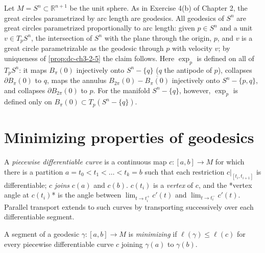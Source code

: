 \begin{example}
  \label{ex:dc-ch3-2-11}
  \notready
  Let $M=S^n\subset\mathbb{R}^{n+1}$ be the unit sphere. As in Exercise 4(b) of
  Chapter 2, the great circles parametrized by arc length are geodesics. All
  geodesics of $S^n$ are great circles parametrized proportionally to arc length:
  given $p\in S^n$ and a unit $v\in T_pS^n$, the intersection of $S^n$ with the
  plane through the origin, $p$, and $v$ is a great circle parametrizable as the
  geodesic through $p$ with velocity $v$; by uniqueness of \cref{prop:dc-ch3-2-5} the claim
  follows. Here $\exp_p$ is defined on all of $T_p S^n$: it maps $B_\pi(0)$
  injectively onto $S^n-\{q\}$ ($q$ the antipode of $p$), collapses
  $\partial B_\pi(0)$ to $q$, maps the annulus $B_{2\pi}(0)-\overline{B_\pi(0)}$
  injectively onto $S^n-\{p,q\}$, and collapses $\partial B_{2\pi}(0)$ to $p$.
  For the manifold $S^n-\{q\}$, however, $\exp_p$ is defined only on
  $B_\pi(0)\subset T_p(S^n-\{q\})$.
\end{example}

\section{Minimizing properties of geodesics}

\begin{definition}
  \label{def:dc-ch3-3-1}
  A \emph{piecewise differentiable curve} is a continuous map $c:[a,b]\to M$ for which
  there is a partition $a=t_0<t_1<\dots<t_k=b$ such that each restriction
  $c|_{[t_i,t_{i+1}]}$ is differentiable; $c$ \emph{joins} $c(a)$ and $c(b)$. $c(t_i)$ is
  a \emph{vertex} of $c$, and the *vertex angle at $c(t_i)$* is the angle between
  $\lim_{t\to t_i^+}c'(t)$ and $\lim_{t\to t_i^-}c'(t)$. Parallel transport extends
  to such curves by transporting successively over each differentiable segment.
\end{definition}

\begin{definition}
  \label{def:dc-ch3-3-2}
  A segment of a geodesic $\gamma:[a,b]\to M$ is \emph{minimizing} if
  $\ell(\gamma)\le\ell(c)$ for every piecewise differentiable curve $c$ joining
  $\gamma(a)$ to $\gamma(b)$.
\end{definition}

